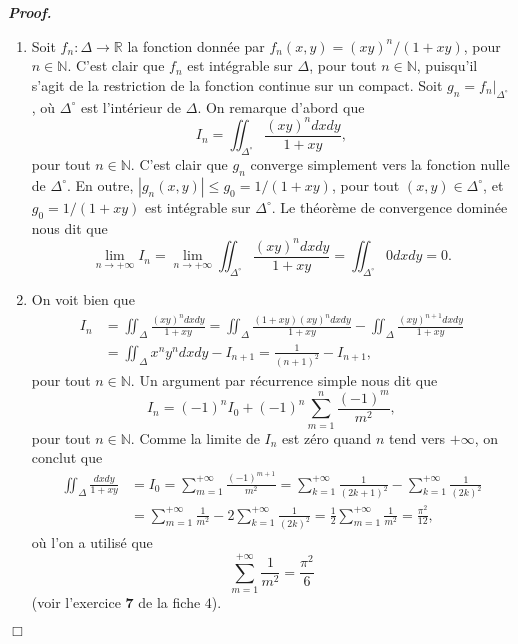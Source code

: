 \documentclass[11pt,a4paper]{article}
\newcommand{\NN}{\mathbb{N}}
\newcommand{\RR}{\mathbb{R}}
\newenvironment{preuve}[1][]
{\vskip 2mm  \noindent\emph{\bf Proof#1. }}{$\Box$ \vskip 2mm}
\let\leq\leqslant
\newcounter{exercice}
\begin{document}
		\begin{preuve}
			\begin{enumerate} 
				\item 
				Soit $f_{n} : \Delta \rightarrow \RR$ la fonction donnée par $f_{n}(x,y) = (xy)^{n}/(1+xy)$, pour $n \in \NN$. 
				C'est clair que $f_{n}$ est intégrable sur $\Delta$, pour tout $n \in \NN$, 
				puisqu'il s'agit de la restriction de la fonction continue sur un compact. 
				Soit $g_{n} = f_{n}|_{\Delta^{\circ}}$, où $\Delta^{\circ}$ est l'intérieur de $\Delta$. 
				On remarque d'abord que 
				\[     I_n=\iint_{\Delta^{\circ}} \frac{(xy)^ndxdy}{1+xy},     \]
				pour tout $n \in \NN$.
				C'est clair que $g_{n}$ converge simplement vers la fonction nulle de $\Delta^{\circ}$. 
				En outre, $|g_{n}(x,y)| \leq g_{0} = 1/(1+xy)$, pour tout $(x,y) \in \Delta^{\circ}$, et $g_{0} = 1/(1+xy)$ est intégrable sur $\Delta^{\circ}$. 
				Le théorème de convergence dominée nous dit que 
				\[     \underset{n \rightarrow +\infty}{\lim} I_{n} = \underset{n \rightarrow +\infty}{\lim} \iint_{\Delta^{\circ}} \frac{(xy)^ndxdy}{1+xy} = \iint_{\Delta^{\circ}} 0 dx dy = 0.     \]
				
				\item On voit bien que 
				\begin{align*}
				I_n&=\iint_\Delta \frac{(xy)^ndxdy}{1+xy} = \iint_\Delta \frac{(1+ xy) (xy)^ndxdy}{1+xy} - \iint_\Delta \frac{(xy)^{n+1} dxdy}{1+xy} 
				\\
				&= \iint_\Delta x^{n} y^{n} dxdy - I_{n+1} = \frac{1}{(n+1)^{2}} - I_{n+1},    
				\end{align*} 
				pour tout $n \in \NN$. 
				Un argument par récurrence simple nous dit que 
				\[     I_{n} = (-1)^{n} I_{0} + (-1)^{n} \sum_{m=1}^{n} \frac{(-1)^{m}}{m^{2}},     \]
				pour tout $n \in \NN$. 
				Comme la limite de $I_{n}$ est zéro quand $n$ tend vers $+ \infty$, on conclut que 
				\begin{align*} 
				\iint_\Delta\frac{dxdy}{1+xy} &= I_{0} = \sum_{m=1}^{+\infty} \frac{(-1)^{m+1}}{m^{2}} = \sum_{k=1}^{+\infty} \frac{1}{(2k+1)^{2}} - \sum_{k=1}^{+\infty} \frac{1}{(2k)^{2}} 
				\\
				&= \sum_{m=1}^{+\infty} \frac{1}{m^{2}} - 2 \sum_{k=1}^{+\infty} \frac{1}{(2k)^{2}} = \frac{1}{2} \sum_{m=1}^{+\infty} \frac{1}{m^{2}} = \frac{\pi^{2}}{12},     
				\end{align*}
				où l'on a utilisé que
				\[    \sum_{m=1}^{+\infty} \frac{1}{m^{2}} = \frac{\pi^{2}}{6}     \]
				(voir l'exercice \textbf{7} de la fiche $4$). 
			\end{enumerate}
		\end{preuve}
		
\end{document}

